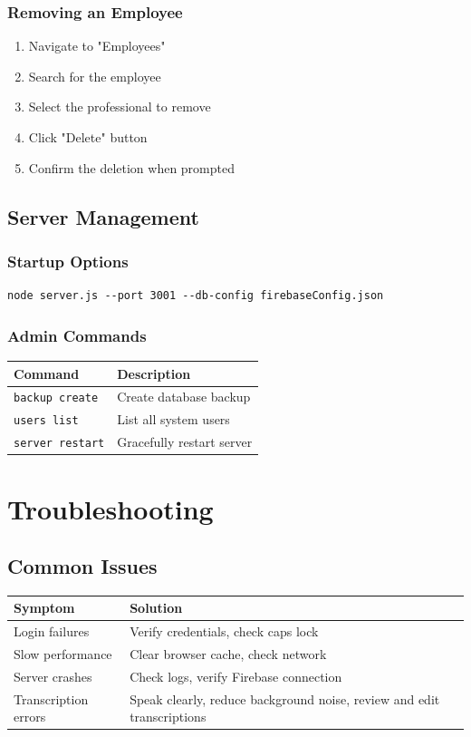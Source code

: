 \documentclass[12pt, titlepage]{article}
\begin{document}
\subsubsection{Removing an Employee}
\begin{enumerate}
\item Navigate to "Employees"
\item Search for the employee
\item Select the professional to remove
\item Click "Delete" button
\item Confirm the deletion when prompted
\end{enumerate}

\subsection{Server Management}
\subsubsection{Startup Options}
\begin{verbatim}
node server.js --port 3001 --db-config firebaseConfig.json
\end{verbatim}

\subsubsection{Admin Commands}
\begin{tabularx}{\textwidth}{lX}
\toprule
\textbf{Command} & \textbf{Description} \\
\midrule
\texttt{backup create} & Create database backup \\
\texttt{users list} & List all system users \\
\texttt{server restart} & Gracefully restart server \\
\bottomrule
\end{tabularx}

\section{Troubleshooting}
\subsection{Common Issues}
\begin{longtable}{p{}p{}}
\toprule
\textbf{Symptom} & \textbf{Solution} \\
\midrule
Login failures & Verify credentials, check caps lock \\
Slow performance & Clear browser cache, check network \\
Server crashes & Check logs, verify Firebase connection \\
Transcription errors & Speak clearly, reduce background noise, review and edit transcriptions \\
\bottomrule
\end{longtable}
\end{document}
